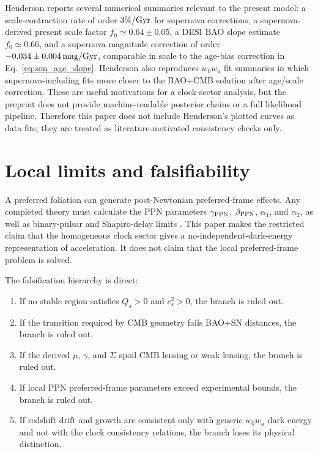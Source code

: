 \documentclass[aps,prd,reprint,nofootinbib,superscriptaddress,longbibliography]{revtex4-2}
\begin{document}
Henderson reports several numerical summaries relevant to the present model: a scale-contraction rate of order $3\%/{\rm Gyr}$ for supernova corrections, a supernova-derived present scale factor $f_0\simeq0.64\pm0.05$, a DESI BAO slope estimate $f_0\simeq0.66$, and a supernova magnitude correction of order $-0.034\pm0.004\,{\rm mag/Gyr}$, comparable in scale to the age-bias correction in Eq.~\eqref{eq:son_age_slope}.  Henderson also reproduces $w_0w_a$ fit summaries in which supernova-including fits move closer to the BAO+CMB solution after age/scale correction.  These are useful motivations for a clock-sector analysis, but the preprint does not provide machine-readable posterior chains or a full likelihood pipeline.  Therefore this paper does not include Henderson's plotted curves as data fits; they are treated as literature-motivated consistency checks only.

\section{Local limits and falsifiability}

A preferred foliation can generate post-Newtonian preferred-frame effects.  Any completed theory must calculate the PPN parameters $\gamma_{\rm PPN}$, $\beta_{\rm PPN}$, $\alpha_1$, and $\alpha_2$, as well as binary-pulsar and Shapiro-delay limits \cite{Will2014}.  This paper makes the restricted claim that the homogeneous clock sector gives a no-independent-dark-energy representation of acceleration.  It does not claim that the local preferred-frame problem is solved.

The falsification hierarchy is direct:
\begin{enumerate}
  \item If no stable region satisfies $Q_s>0$ and $c_s^2>0$, the branch is ruled out.
  \item If the transition required by CMB geometry fails BAO+SN distances, the branch is ruled out.
  \item If the derived $\mu$, $\gamma$, and $\Sigma$ spoil CMB lensing or weak lensing, the branch is ruled out.
  \item If local PPN preferred-frame parameters exceed experimental bounds, the branch is ruled out.
  \item If redshift drift and growth are consistent only with generic $w_0w_a$ dark energy and not with the clock consistency relations, the branch loses its physical distinction.
\end{enumerate}
\end{document}
